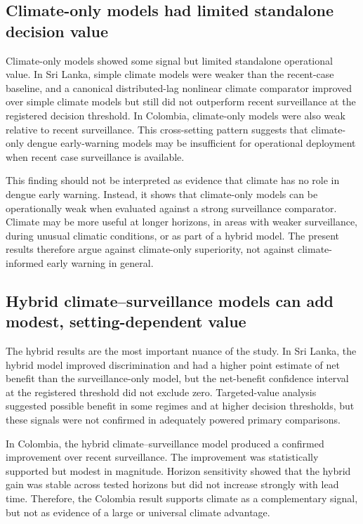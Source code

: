 \documentclass[11pt,a4paper]{article}
\begin{document}
\subsection{Climate-only models had limited standalone decision value}
\label{subsec:climate-only-discussion}

Climate-only models showed some signal but limited standalone operational value. In Sri Lanka, simple climate models were weaker than the recent-case baseline, and a canonical distributed-lag nonlinear climate comparator improved over simple climate models but still did not outperform recent surveillance at the registered decision threshold. In Colombia, climate-only models were also weak relative to recent surveillance. This cross-setting pattern suggests that climate-only dengue early-warning models may be insufficient for operational deployment when recent case surveillance is available.

This finding should not be interpreted as evidence that climate has no role in dengue early warning. Instead, it shows that climate-only models can be operationally weak when evaluated against a strong surveillance comparator. Climate may be more useful at longer horizons, in areas with weaker surveillance, during unusual climatic conditions, or as part of a hybrid model. The present results therefore argue against climate-only superiority, not against climate-informed early warning in general.

\subsection{Hybrid climate--surveillance models can add modest, setting-dependent value}
\label{subsec:hybrid-discussion}

The hybrid results are the most important nuance of the study. In Sri Lanka, the hybrid model improved discrimination and had a higher point estimate of net benefit than the surveillance-only model, but the net-benefit confidence interval at the registered threshold did not exclude zero. Targeted-value analysis suggested possible benefit in some regimes and at higher decision thresholds, but these signals were not confirmed in adequately powered primary comparisons.

In Colombia, the hybrid climate--surveillance model produced a confirmed improvement over recent surveillance. The improvement was statistically supported but modest in magnitude. Horizon sensitivity showed that the hybrid gain was stable across tested horizons but did not increase strongly with lead time. Therefore, the Colombia result supports climate as a complementary signal, but not as evidence of a large or universal climate advantage.
\end{document}
